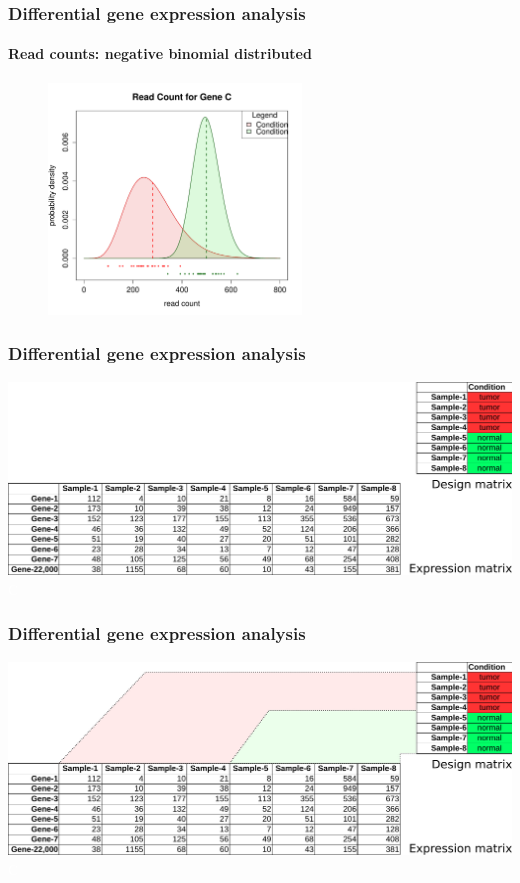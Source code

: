 \documentclass{beamer}			  %
\begin{document}
\begin{frame}
\frametitle{Differential gene expression analysis}
\framesubtitle{Read counts: negative binomial distributed}
	\begin{figure}
	\includegraphics[width=0.60\textwidth]{figures/dge_10bp.pdf}
	\end{figure}
\end{frame}


\begin{frame}
	\frametitle{Differential gene expression analysis}
	\includegraphics[width=\textwidth]{figures/dge_11ap.pdf} \\
	\textcolor{white}{C}
\end{frame}

\begin{frame}
	\frametitle{Differential gene expression analysis}
	\includegraphics[width=\textwidth]{figures/dge_11bp.pdf} \\
	\textcolor{white}{C}
\end{frame}
\end{document}
